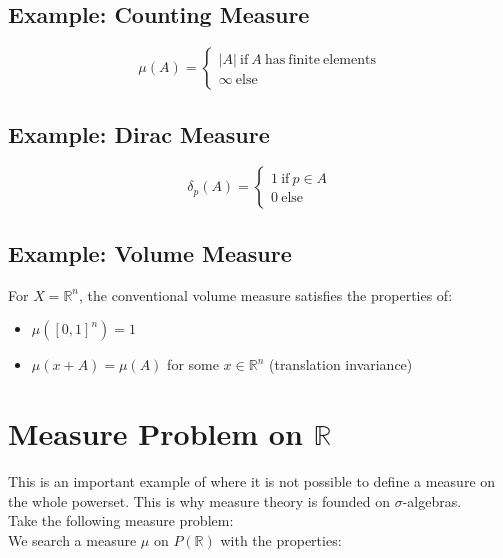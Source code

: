 \subsection{Example: Counting Measure}

\begin{equation}
\mu(A) = \left\{\begin{array}{l} |A| \mathrm{\ if\ }A\mathrm{\ has\ finite\ elements}\\ \infty\mathrm{\ else}\end{array}\right.
\end{equation}

\subsection{Example: Dirac Measure}
\begin{equation}
\delta_p(A) = \left\{\begin{array}{l} 1 \mathrm{\ if\ }p\in A\\ 0 \mathrm{\ else} \end{array}\right.
\end{equation}

\subsection{Example: Volume Measure}
For $X=\mathbb{R}^n$, the conventional volume measure satisfies the properties of:

\begin{itemize}
\item $\mu([0,1]^n) = 1$
\item $\mu(x + A) = \mu(A)$ for some $x\in \mathbb{R}^n$ (translation invariance)
\end{itemize}



\section{Measure Problem on $\mathbb{R}$}

This is an important example of where it is not possible to define a measure on the whole powerset. This is why measure theory is founded on $\sigma$-algebras.\\

Take the following measure problem:\\

We search a measure $\mu$ on $P(\mathbb{R})$ with the properties:

